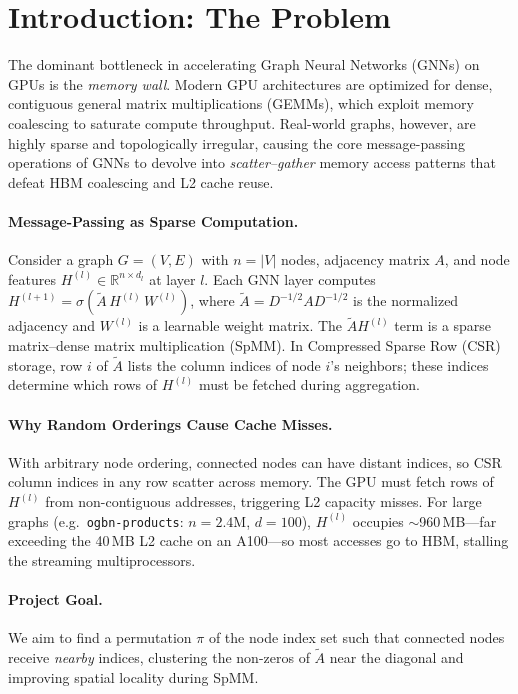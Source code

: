 \documentclass[sigconf,review]{acmart}
\begin{document}
\section{Introduction: The Problem}

The dominant bottleneck in accelerating Graph Neural Networks (GNNs) on GPUs is the \emph{memory wall}. Modern GPU architectures are optimized for dense, contiguous general matrix multiplications (GEMMs), which exploit memory coalescing to saturate compute throughput. Real-world graphs, however, are highly sparse and topologically irregular, causing the core message-passing operations of GNNs to devolve into \emph{scatter--gather} memory access patterns that defeat HBM coalescing and L2 cache reuse.

\paragraph{Message-Passing as Sparse Computation.}
Consider a graph $G = (V, E)$ with $n = |V|$ nodes, adjacency matrix $A$, and node features $H^{(l)} \in \mathbb{R}^{n \times d_l}$ at layer $l$. Each GNN layer computes $H^{(l+1)} = \sigma(\tilde{A}\,H^{(l)}\,W^{(l)})$, where $\tilde{A} = D^{-1/2}AD^{-1/2}$ is the normalized adjacency \cite{kipf2017gcn} and $W^{(l)}$ is a learnable weight matrix. The $\tilde{A}H^{(l)}$ term is a sparse matrix--dense matrix multiplication (SpMM). In Compressed Sparse Row (CSR) storage, row $i$ of $\tilde{A}$ lists the column indices of node $i$'s neighbors; these indices determine which rows of $H^{(l)}$ must be fetched during aggregation.

\paragraph{Why Random Orderings Cause Cache Misses.}
With arbitrary node ordering, connected nodes can have distant indices, so CSR column indices in any row scatter across memory. The GPU must fetch rows of $H^{(l)}$ from non-contiguous addresses, triggering L2 capacity misses. For large graphs (e.g.\ \texttt{ogbn-products}: $n{=}2.4$M, $d{=}100$), $H^{(l)}$ occupies $\sim$960\,MB---far exceeding the 40\,MB L2 cache on an A100---so most accesses go to HBM, stalling the streaming multiprocessors.

\paragraph{Project Goal.}
We aim to find a permutation $\pi$ of the node index set such that connected nodes receive \emph{nearby} indices, clustering the non-zeros of $\tilde{A}$ near the diagonal and improving spatial locality during SpMM.
\end{document}
